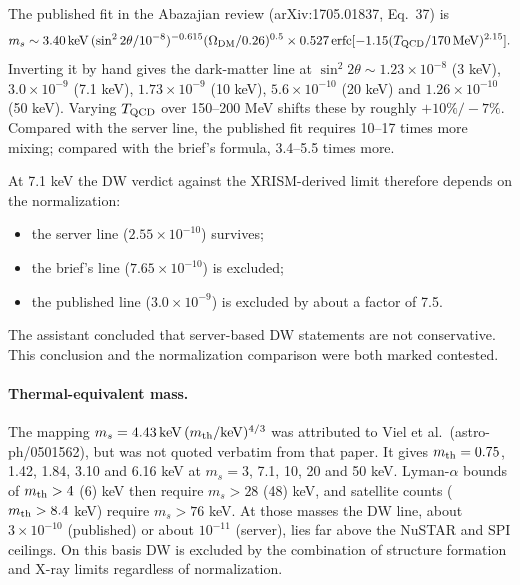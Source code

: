 \documentclass[11pt,a4paper]{article}
\begin{document}
The published fit in the Abazajian review (arXiv:1705.01837, Eq.~37) is
\[
m_s\sim3.40\,{\rm keV}\,(\sin^2 2\theta/10^{-8})^{-0.615}(\Omega_{\rm DM}/0.26)^{0.5}\times0.527\,{\rm erfc}[-1.15(T_{\rm QCD}/170\,{\rm MeV})^{2.15}].
\]
Inverting it by hand gives the dark-matter line at $\sin^2 2\theta\sim1.23\times10^{-8}$ (3 keV), $3.0\times10^{-9}$ (7.1 keV), $1.73\times10^{-9}$ (10 keV), $5.6\times10^{-10}$ (20 keV) and $1.26\times10^{-10}$ (50 keV). Varying $T_{\rm QCD}$ over 150--200 MeV shifts these by roughly $+10\%/-7\%$. Compared with the server line, the published fit requires 10--17 times more mixing; compared with the brief's formula, 3.4--5.5 times more.

At 7.1 keV the DW verdict against the XRISM-derived limit therefore depends on the normalization:
\begin{itemize}
\item the server line ($2.55\times10^{-10}$) survives;
\item the brief's line ($7.65\times10^{-10}$) is excluded;
\item the published line ($3.0\times10^{-9}$) is excluded by about a factor of 7.5.
\end{itemize}
The assistant concluded that server-based DW statements are not conservative. This conclusion and the normalization comparison were both marked contested.

\paragraph{Thermal-equivalent mass.} The mapping $m_s=4.43\,{\rm keV}\,(m_{\rm th}/{\rm keV})^{4/3}$ was attributed to Viel et al.\ (astro-ph/0501562), but was not quoted verbatim from that paper. It gives $m_{\rm th}=0.75$, 1.42, 1.84, 3.10 and 6.16 keV at $m_s=3$, 7.1, 10, 20 and 50 keV. Lyman-$\alpha$ bounds of $m_{\rm th}>4$ (6) keV then require $m_s>28$ (48) keV, and satellite counts ($m_{\rm th}>8.4$ keV) require $m_s>76$ keV. At those masses the DW line, about $3\times10^{-10}$ (published) or about $10^{-11}$ (server), lies far above the NuSTAR and SPI ceilings. On this basis DW is excluded by the combination of structure formation and X-ray limits regardless of normalization.
\end{document}
